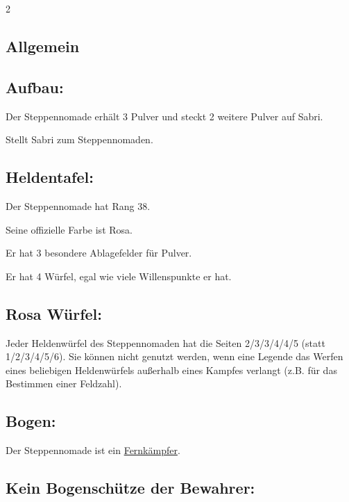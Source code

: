 \documentclass[10pt, a4paper, oneside]{book}
\begin{document}
\begin{multicols*}{2}\raggedcolumns


\begin{nobgcolor}

\section{Allgemein}




\subsection{Aufbau:}

Der Steppennomade erhält 3 Pulver und steckt 2 weitere Pulver auf Sabri.
\supercite{MH:Begleitheft}

Stellt Sabri zum Steppennomaden.
\supercite{MH:Begleitheft}



\subsection{Heldentafel:}

Der Steppennomade hat Rang 38.

Seine offizielle Farbe ist Rosa.

Er hat 3 besondere Ablagefelder für Pulver.

Er hat 4 Würfel, egal wie viele Willenspunkte er hat. 




\subsection{Rosa Würfel:}

Jeder Heldenwürfel des Steppennomaden hat die Seiten 2/3/3/4/4/5 (statt 1/2/3/4/5/6). Sie können nicht genutzt werden, wenn eine Legende das Werfen eines beliebigen Heldenwürfels außerhalb eines Kampfes verlangt (z.B. für das Bestimmen einer Feldzahl).
\supercite{88552}


\subsection{Bogen:}

Der Steppennomade ist ein \hyperref[Fernkämpfer]{Fernkämpfer}.



\subsection{Kein Bogenschütze der Bewahrer:}


\end{nobgcolor}
\end{multicols*}
\end{document}

